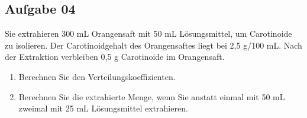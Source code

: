 \documentclass[a4paper,11pt]{article}
\newif\ifshowme
\begin{document}
\subsection*{Aufgabe 04}
Sie extrahieren 300 mL Orangensaft mit 50 mL Lösungsmittel, um Carotinoide zu isolieren.
Der Carotinoidgehalt des Orangensaftes liegt bei 2,5 g/100 mL. Nach der Extraktion
verbleiben 0,5 g Carotinoide im Orangensaft.
\begin{enumerate}[label=\alph*)]
\item Berechnen Sie den Verteilungskoeffizienten.
\ifshowme
\antwort{
\par 100 ml Orangensaft enthalten nach dem extrahieren 0,16 g Carotinoide. Das Lösungsmittel folglich (3*2,5 g - 0,5 g)/50 ml
\begin{align*}
\frac{14~\text{g / 100 ml}}{0,1\overline{6}~\text{g / 100 ml}} = 84
\end{align*}

\begin{align*}
K &= \frac{(x - y) / 50ml}{y / 300ml}  \\
K &= \frac{7/50}{0,5/300} \\
 &= 84
\end{align*}
}
\else
\fi

\item Berechnen Sie die extrahierte Menge, wenn Sie anstatt einmal mit 50 mL zweimal mit 25
mL Lösungsmittel extrahieren.

\ifshowme
\antwort{

\textbf{Erste Extraktion:}
\begin{align*}
84 &= \frac{(x-y)/25}{y/300ml} \\
&= \frac{(7,5-y)/25}{y/300ml} \\
&= \frac{7,5/25 - y/25}{y/300ml} \\
84 \cdot \frac{y}{300ml} &= \frac{7,5}{25} - \frac{y}{25} \\
\frac{84 \cdot y \cdot 25}{300ml} &= 7,5 - y \\
\frac{2100y}{300ml} &= 7,5 - y \\
2100y &= 2250 - 300y \\
2400y &= 2250 \\
y &= 0,9375 ~\text{g}
\end{align*}

\textbf{Zweite Extraktion:}
\begin{align*}
&... \\
\frac{2100y}{300ml} &= 0,9375 - y \\
2100y &= 281,25 - 300y \\
2400y &= 281,25\\
y &= 0,117 ~\text{g}
\end{align*}

}
\else
\fi

\end{enumerate}
\end{document}
